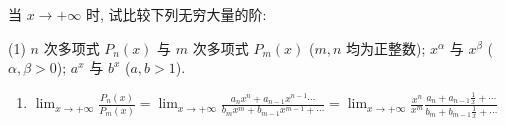 \begin{exercise}[1.3.17]
    当 $x \to +\infty$ 时, 试比较下列无穷大量的阶:
    \begin{tasks}[label=(\arabic*)](1)
        \task $n$ 次多项式 $P_n(x)$ 与 $m$ 次多项式 $P_m(x)$ ($m,n$ 均为正整数);
        \task $x^\alpha$ 与 $x^\beta$ ($\alpha, \beta > 0$);
        \task $a^x$ 与 $b^x$ ($a, b > 1$).
    \end{tasks}
\end{exercise}
\begin{solution}
    \begin{enumerate}[(1)]
        \item
              $\lim_{x \to +\infty} \frac{P_n(x)}{P_m(x)} = \lim_{x \to +\infty} \frac{a_n x^n +a_{n-1} x^{n-1} \cdots}{b_m x^m +b_{m-1} x^{m-1} +\cdots}
                  = \lim_{x \to +\infty} \frac{x^n}{x^m}\frac{a_n  +a_{n-1} \frac{1}{x} +\cdots}{b_m + b_{m-1}\frac{1}{x} +\cdots}$


\end{enumerate}
\end{solution}
